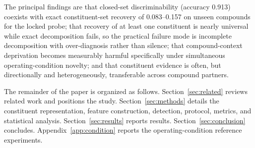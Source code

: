 The principal findings are that closed-set discriminability (accuracy
0.913) coexists with exact constituent-set recovery of 0.083--0.157 on
unseen compounds for the locked probe; that recovery of at least one
constituent is nearly universal while exact decomposition fails, so the
practical failure mode is incomplete decomposition with over-diagnosis
rather than silence; that compound-context deprivation becomes measurably
harmful specifically under simultaneous operating-condition novelty; and
that constituent evidence is often, but directionally and heterogeneously,
transferable across compound partners.

The remainder of the paper is organized as follows.
Section~\ref{sec:related} reviews related work and positions the study.
Section~\ref{sec:methods} details the constituent representation, feature
construction, detection, protocol, metrics, and statistical analysis.
Section~\ref{sec:results} reports results. Section~\ref{sec:conclusion}
concludes. Appendix~\ref{app:condition} reports the operating-condition
reference experiments.
